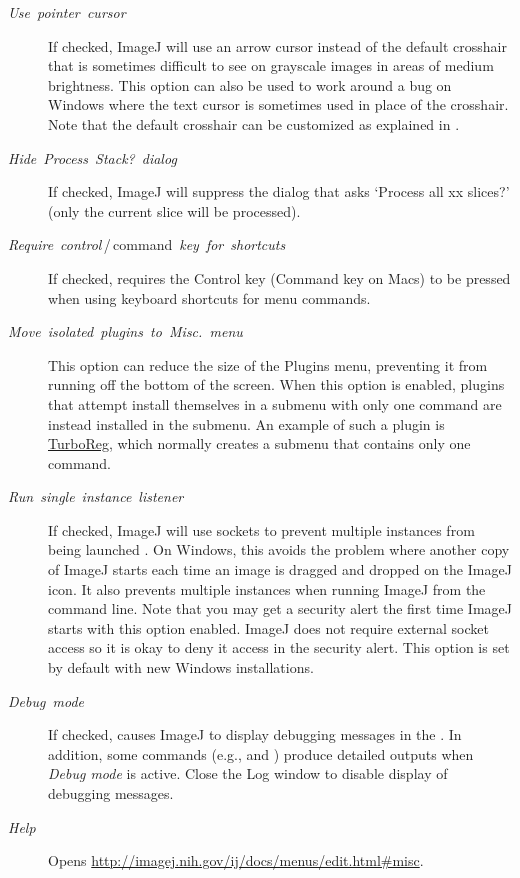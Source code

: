 \begin{description}
\item [{\emph{Use\ pointer\ cursor}}] If checked, ImageJ will use an
arrow cursor instead of the default crosshair that is sometimes difficult
to see on grayscale images in areas of medium brightness. This option
can also be used to work around a bug on Windows where the text cursor
is sometimes used in place of the crosshair. Note
that the default crosshair can be customized as explained in .
\item [{\emph{Hide}\ \emph{\textquotedbl{}Process}\ \emph{Stack?\textquotedbl{}}\ \emph{dialog}}] If
checked, ImageJ will suppress the dialog that asks `Process all xx
slices?' (only the current slice will be processed).
\item [{\emph{Require}\ \emph{control}\,/\,command\ \emph{key}\ \emph{for}\ \emph{shortcuts}}] If
checked, requires the Control key (Command key on Macs) to be pressed
when using keyboard shortcuts for menu commands.
\item [{\emph{Move\ isolated\ plugins\ to\ Misc.\ menu}}] This option
can reduce the size of the Plugins menu, preventing it from running
off the bottom of the screen. When this option is enabled, plugins
that attempt install themselves in a submenu with only one command
are instead installed in the 
submenu. An example of such a plugin is \href{http://bigwww.epfl.ch/thevenaz/turboreg/}{TurboReg},
which normally creates a 
submenu that contains only one command.
\item [{\emph{Run}\ \emph{single}\ \emph{instance}\ \emph{listener}}] \improvement{}If
checked, ImageJ will use sockets to prevent multiple instances from
being launched \cite{C-SocketListener}. On Windows, this avoids the
problem where another copy of ImageJ starts each time an image is
dragged and dropped on the ImageJ icon. It also prevents multiple
instances when running ImageJ from the command line. Note that you
may get a security alert the first time ImageJ starts with this option
enabled. ImageJ does not require external socket access so it is okay
to deny it access in the security alert. This option is set by default
with new Windows installations.
\item [{\emph{Debug\ mode}}] If checked, causes ImageJ to display debugging
messages in the . In addition, some commands
(e.g., 
and ) produce detailed outputs
when \emph{Debug mode} is active. Close the Log window to disable
display of debugging messages.
\item [{\emph{Help}}] Opens \url{http://imagej.nih.gov/ij/docs/menus/edit.html#misc}.
\end{description}

